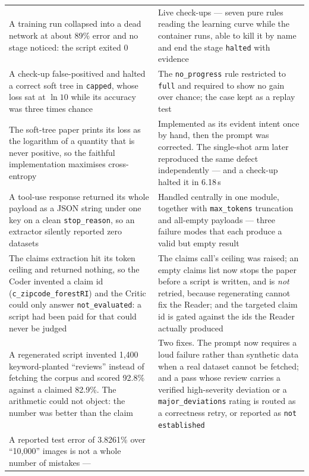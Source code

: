 \documentclass[11pt]{article}
\begin{document}
\begin{table}[tbp]
\begin{tabular}{L{0.47\textwidth}L{0.47\textwidth}}
A training run collapsed into a dead network at about 89\% error and no stage noticed: the script
  exited 0 & Live check-ups --- seven pure rules reading the learning curve while the container
  runs, able to kill it by name and end the stage \texttt{halted} with evidence \\
A check-up false-positived and halted a correct soft tree in \texttt{capped}, whose loss sat at
  $\ln 10$ while its accuracy was three times chance & The \texttt{no\_progress} rule restricted
  to \texttt{full} and required to show no gain over chance; the case kept as a replay test \\
The soft-tree paper prints its loss as the logarithm of a quantity that is never positive, so the
  faithful implementation maximises cross-entropy & Implemented as its evident intent once by
  hand, then the prompt was corrected. The single-shot arm later reproduced the same defect
  independently --- and a check-up halted it in 6.18\,s \\
A tool-use response returned its whole payload as a JSON string under one key on a clean
  \texttt{stop\_reason}, so an extractor silently reported zero datasets & Handled centrally in
  one module, together with \texttt{max\_tokens} truncation and all-empty payloads --- three
  failure modes that each produce a valid but empty result \\
The claims extraction hit its token ceiling and returned nothing, so the Coder invented a claim
  id (\texttt{c\_zipcode\_}\allowbreak\texttt{forestRI}) and the Critic could only answer
  \texttt{not\_evaluated}: a script had been paid for that could never be judged & The claims
  call's ceiling was raised; an empty claims list now stops the paper before a script is written,
  and is \emph{not} retried, because regenerating cannot fix the Reader; and the targeted claim id
  is gated against the ids the Reader actually produced \\
A regenerated script invented 1{,}400 keyword-planted ``reviews'' instead of fetching the corpus
  and scored 92.8\% against a claimed 82.9\%. The arithmetic could not object: the number was
  better than the claim & Two fixes. The prompt now requires a loud failure rather than synthetic
  data when a real dataset cannot be fetched; and a pass whose review carries a verified
  high-severity deviation or a \texttt{major\_deviations} rating is routed as a correctness retry,
  or reported as \texttt{not established} \\
A reported test error of 3.8261\% over ``10{,}000'' images is not a whole number of mistakes ---

\end{tabular}
\end{table}
\end{document}
